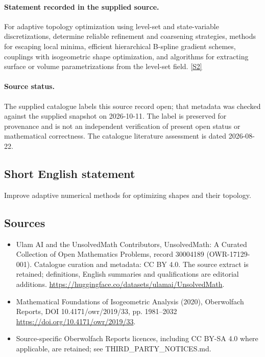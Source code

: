 \documentclass[11pt]{article}
\begin{document}
\paragraph{Statement recorded in the supplied source.}
For adaptive topology optimization using level-set and state-variable discretizations, determine reliable refinement and coarsening strategies, methods for escaping local minima, efficient hierarchical B-spline gradient schemes, couplings with isogeometric shape optimization, and algorithms for extracting surface or volume parametrizations from the level-set field. \href{https://doi.org/10.4171/owr/2019/33}{[S2]}
\paragraph{Source status.}
The supplied catalogue labels this source record open; that metadata was checked against the supplied snapshot on 2026-10-11. The label is preserved for provenance and is not an independent verification of present open status or mathematical correctness. The catalogue literature assessment is dated 2026-08-22.
\subsection{Short English statement}
Improve adaptive numerical methods for optimizing shapes and their topology.
\subsection{Sources}
\begin{itemize}
\item[S1] Ulam AI and the UnsolvedMath Contributors, UnsolvedMath: A Curated Collection of Open Mathematics Problems, record 30004189 (OWR-17129-001). Catalogue curation and metadata: CC BY 4.0. The source extract is retained; definitions, English summaries and qualifications are editorial additions.
\url{https://huggingface.co/datasets/ulamai/UnsolvedMath}.
\item[S2] Mathematical Foundations of Isogeometric Analysis (2020), Oberwolfach Reports, DOI 10.4171/owr/2019/33, pp. 1981--2032
\url{https://doi.org/10.4171/owr/2019/33}.
\item Source-specific Oberwolfach Reports licences, including CC BY-SA 4.0 where applicable, are retained; see THIRD\_PARTY\_NOTICES.md.
\end{itemize}
\end{document}
